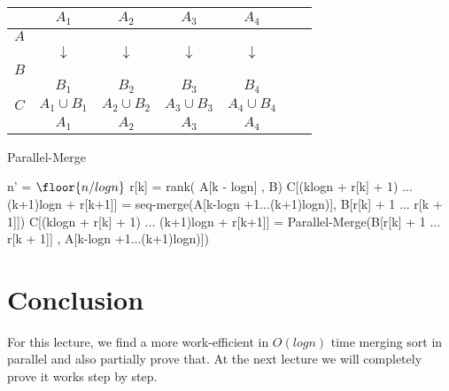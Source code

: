 \documentclass[11pt]{article}
\begin{document}
\begin{center}
\begin{tabular}{ |c|c|c|c|c|c|c| }
  \multicolumn{1}{c}{} &
  \multicolumn{1}{c}{$A_1$} &
  \multicolumn{1}{c}{$A_2$} &
  \multicolumn{1}{c}{$A_3$} &
  \multicolumn{1}{c}{$A_4$} &
  \multicolumn{1}{c}{}\\
\hline
 $A$  & & & & & & \\
 \hline
  \multicolumn{1}{c}{} &
  \multicolumn{1}{c}{$\downarrow$} &
  \multicolumn{1}{c}{$\downarrow$} &
  \multicolumn{1}{c}{$\downarrow$} &
  \multicolumn{1}{c}{$\downarrow$} &
  \multicolumn{1}{c}{} \\
 \hline
 $B$ & & & & & & \\
 \hline
 \multicolumn{1}{c}{} &
 \multicolumn{1}{c}{$B_1$} &
 \multicolumn{1}{c}{$B_2$} &
 \multicolumn{1}{c}{$B_3$} &
 \multicolumn{1}{c}{$B_4$} &
 \multicolumn{1}{c}{} \\
 \hline
 $C$  & $A_1 \cup B_1$ &$A_2 \cup B_2$  &$A_3 \cup B_3$  & $A_4 \cup B_4$ & & \\
 \hline
 \multicolumn{1}{c}{} &
 \multicolumn{1}{c}{$A_1$} &
 \multicolumn{1}{c}{$A_2$} &
 \multicolumn{1}{c}{$A_3$} &
 \multicolumn{1}{c}{$A_4$} &
 \multicolumn{1}{c}{}\\
 
\end{tabular}
\end{center}


\begin{algorithm}
\caption{Parallel-Merge}
\begin{algorithmic}[1]
\State n' = $\floor{n/logn}$
  \State r[k] = rank( A[k - logn] , B)
  \State C[(klogn + r[k] + 1) ... (k+1)logn + r[k+1]] = seq-merge(A[k-logn +1...(k+1)logn)], B[r[k] + 1 ... r[k + 1]])
  \else
  \State C[(klogn + r[k] + 1) ... (k+1)logn + r[k+1]] = Parallel-Merge(B[r[k] + 1 ... r[k + 1]] , A[k-logn +1...(k+1)logn)])
  \EndIf
\EndFor
\end{algorithmic}
\end{algorithm}

\section{Conclusion}
For this lecture, we find a more work-efficient in $O(logn)$ time merging sort in parallel and also partially prove that.  At the next lecture we will completely prove it works step by step. 

%

\end{document}
